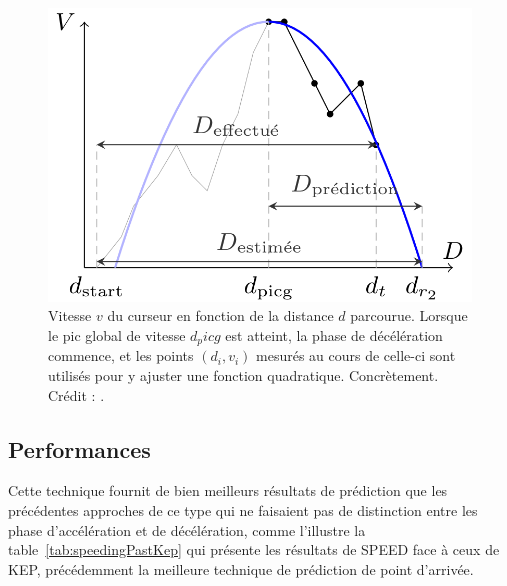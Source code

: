 	\begin{figure}[H]
		\centering
		\includegraphics[width=\textwidth]{figures/ch2/speedExplained}
		\caption[Fonctionnement de SPEED]{Vitesse $v$ du curseur en fonction de la distance $d$ parcourue. Lorsque le pic global de vitesse $d_picg$ est atteint, la phase de décélération commence, et les points $(d_{i}, v_{i})$ mesurés au cours de celle-ci sont utilisés pour y ajuster une fonction quadratique. Concrètement. Crédit : \cite{wonner2011speed}.}
		\label{fig:speedExplained}
	\end{figure}
	
	\subsection{Performances}	
	Cette technique fournit de bien meilleurs résultats de prédiction que les précédentes approches de ce type qui ne faisaient pas de distinction entre les phase d'accélération et de décélération, comme l'illustre la table~\ref{tab:speedingPastKep} qui présente les résultats de SPEED face à ceux de KEP, précédemment la meilleure technique de prédiction de point d'arrivée.
	
